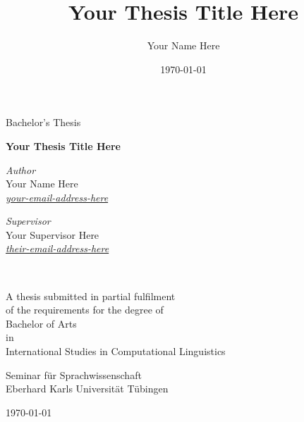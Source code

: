\documentclass[a4paper]{article}
\title{Your Thesis Title Here}
\author{Your Name Here}
\date{\today}
\begin{document}
\begin{titlepage}
\begin{center}
\vspace*{.15\textheight}
{\Large Bachelor's Thesis}
\vspace{2em}

\vspace{0.6cm}
{\bfseries\huge
Your Thesis Title Here
}\\[1cm] 
\vspace*{.05\textheight}
 
\begin{minipage}[t]{0.49\textwidth}
\begin{flushleft} 
{\large
\textit{Author}\\
Your Name Here}\\
\href{mailto:your-email-address-here}{\textit{your-email-address-here}}\\
\end{flushleft}
\end{minipage}
\begin{minipage}[t]{0.49\textwidth}
\begin{flushright}
{\large
\textit{Supervisor}\\
Your Supervisor Here}\\
\href{mailto:their-email-address-here}{\textit{their-email-address-here}}\\
\end{flushright}
\end{minipage}\\

\vfill

A thesis submitted in partial fulfilment\\
of the requirements for the degree of\\[2mm]
{\large Bachelor of Arts}\\
in\\[1mm]
{\large International Studies in Computational Linguistics}

\vspace*{.1\textheight}

{\large Seminar für Sprachwissenschaft\\
Eberhard Karls Universität Tübingen

\vspace{1em}
\today}
\end{center}
\end{titlepage}

\end{document}
